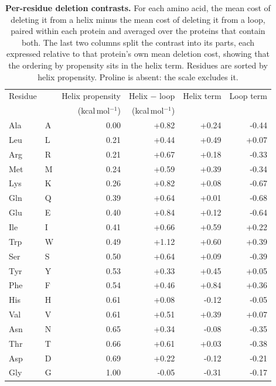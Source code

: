 \begin{table}[t]
\centering
\small
\caption{\textbf{Per-residue deletion contrasts.} For each amino acid, the mean cost of deleting it from a helix minus the mean cost of deleting it from a loop, paired within each protein and averaged over the proteins that contain both. The last two columns split the contrast into its parts, each expressed relative to that protein's own mean deletion cost, showing that the ordering by propensity sits in the helix term. Residues are sorted by helix propensity. Proline is absent: the \citet{pace1998} scale excludes it.}
\label{tab:perres}
\begin{tabular}{llrrrr}
\toprule
Residue & & Helix propensity & Helix $-$ loop & Helix term & Loop term \\
 & & (kcal\,mol$^{-1}$) & (kcal\,mol$^{-1}$) & & \\
\midrule
Ala & A & 0.00 & +0.82 & +0.24 & -0.44 \\
Leu & L & 0.21 & +0.44 & +0.49 & +0.07 \\
Arg & R & 0.21 & +0.67 & +0.18 & -0.33 \\
Met & M & 0.24 & +0.59 & +0.39 & -0.34 \\
Lys & K & 0.26 & +0.82 & +0.08 & -0.67 \\
Gln & Q & 0.39 & +0.64 & +0.01 & -0.68 \\
Glu & E & 0.40 & +0.84 & +0.12 & -0.64 \\
Ile & I & 0.41 & +0.66 & +0.59 & +0.22 \\
Trp & W & 0.49 & +1.12 & +0.60 & +0.39 \\
Ser & S & 0.50 & +0.64 & +0.09 & -0.39 \\
Tyr & Y & 0.53 & +0.33 & +0.45 & +0.05 \\
Phe & F & 0.54 & +0.46 & +0.84 & +0.36 \\
His & H & 0.61 & +0.08 & -0.12 & -0.05 \\
Val & V & 0.61 & +0.51 & +0.39 & +0.07 \\
Asn & N & 0.65 & +0.34 & -0.08 & -0.35 \\
Thr & T & 0.66 & +0.61 & +0.03 & -0.38 \\
Asp & D & 0.69 & +0.22 & -0.12 & -0.21 \\
Gly & G & 1.00 & -0.05 & -0.31 & -0.17 \\
\bottomrule
\end{tabular}
\end{table}
